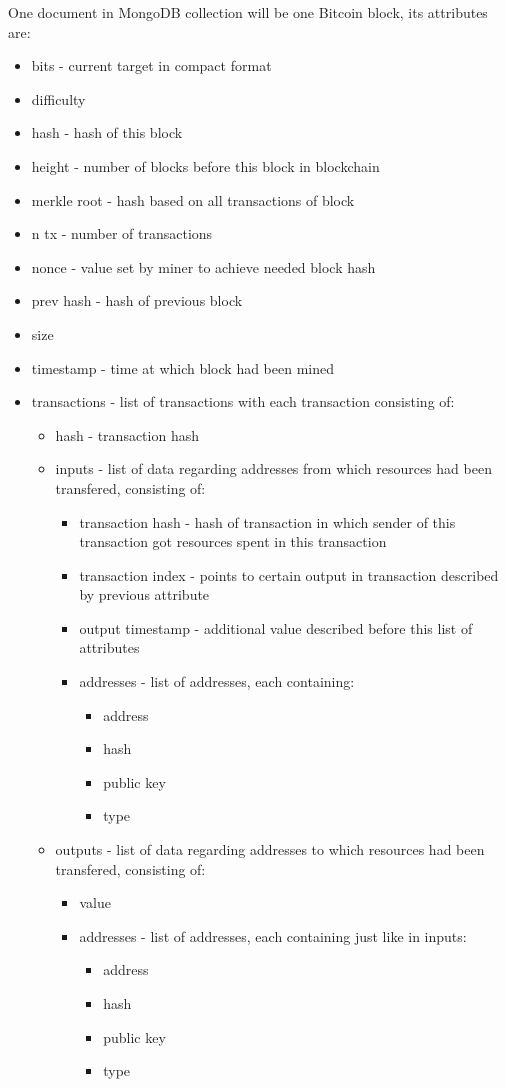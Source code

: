\documentclass[12pt, en, eng, oneside, final]{mgr}
\begin{document}
One document in MongoDB collection will be one Bitcoin block, its attributes are:
\begin{itemize}
\item
bits - current target in compact format \cite{bitcoin-wiki-bha}
\item
difficulty
\item
hash - hash of this block
\item
height - number of blocks before this block in blockchain
\item
merkle root - hash based on all transactions of block
\item
n tx - number of transactions
\item
nonce - value set by miner to achieve needed block hash
\item
prev hash - hash of previous block
\item
size
\item
timestamp - time at which block had been mined
\item
transactions - list of transactions with each transaction consisting of:
\begin{itemize}
\item
hash - transaction hash
\item
inputs - list of data regarding addresses from which resources had been transfered, consisting of:
\begin{itemize}
\item
transaction hash - hash of transaction in which sender of this transaction got resources spent in this transaction
\item
transaction index - points to certain output in transaction described by previous attribute
\item
output timestamp - additional value described before this list of attributes
\item addresses - list of addresses, each containing:
\begin{itemize}
\item
address
\item
hash
\item
public key
\item
type
\end{itemize}
\end{itemize}	
\item
outputs - list of data regarding addresses to which resources had been transfered, consisting of:	
\begin{itemize}
\item
value
\item addresses - list of addresses, each containing just like in inputs:
\begin{itemize}
\item
address
\item
hash
\item
public key
\item
type
\end{itemize}
\end{itemize} 	
\end{itemize}
\end{itemize}
\end{document}
